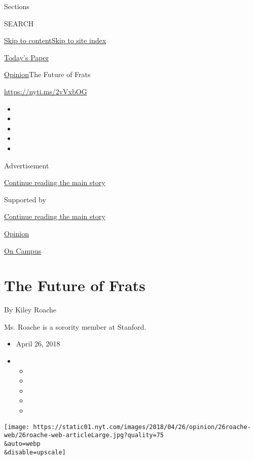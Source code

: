 Sections

SEARCH

\protect\hyperlink{site-content}{Skip to
content}\protect\hyperlink{site-index}{Skip to site index}

\href{https://myaccount.nytimes.com/auth/login?response_type=cookie\&client_id=vi}{}

\href{https://www.nytimes.com/section/todayspaper}{Today's Paper}

\href{/section/opinion}{Opinion}\textbar{}The Future of Frats

\href{https://nyti.ms/2vVxbOG}{https://nyti.ms/2vVxbOG}

\begin{itemize}
\item
\item
\item
\item
\item
\end{itemize}

Advertisement

\protect\hyperlink{after-top}{Continue reading the main story}

Supported by

\protect\hyperlink{after-sponsor}{Continue reading the main story}

\href{/section/opinion}{Opinion}

\href{/column/on-campus}{On Campus}

\hypertarget{the-future-of-frats}{%
\section{The Future of Frats}\label{the-future-of-frats}}

By Kiley Roache

Ms. Roache is a sorority member at Stanford.

\begin{itemize}
\item
  April 26, 2018
\item
  \begin{itemize}
  \item
  \item
  \item
  \item
  \item
  \end{itemize}
\end{itemize}

\texttt{[image: https://static01.nyt.com/images/2018/04/26/opinion/26roache-web/26roache-web-articleLarge.jpg?quality=75\\\&auto=webp\\\&disable=upscale]}

